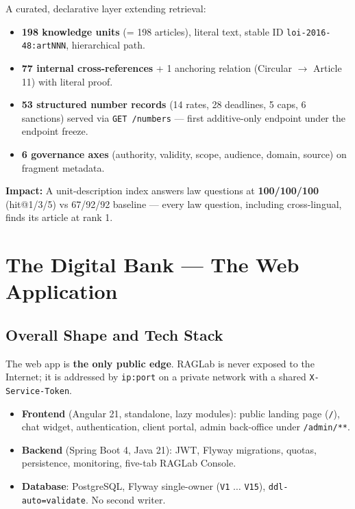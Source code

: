 \documentclass[a4paper,12pt]{report}
\begin{document}
A curated, declarative layer extending retrieval:

\begin{itemize}[leftmargin=1.2cm, itemsep=2pt]
\item \textbf{198 knowledge units} (= 198 articles), literal text, stable ID \texttt{loi-2016-48:artNNN}, hierarchical path.
\item \textbf{77 internal cross-references} + 1 anchoring relation (Circular $\rightarrow$ Article 11) with literal proof.
\item \textbf{53 structured number records} (14 rates, 28 deadlines, 5 caps, 6 sanctions) served via \texttt{GET /numbers} --- first additive-only endpoint under the endpoint freeze.
\item \textbf{6 governance axes} (authority, validity, scope, audience, domain, source) on fragment metadata.
\end{itemize}

\begin{tcolorbox}[colback=softGray, colframe=chapterBlue!25, boxrule=0.5pt, arc=3pt]
\small \textbf{Impact:} A unit-description index answers law questions at \textbf{100/100/100} (hit@1/3/5) vs 67/92/92 baseline --- every law question, including cross-lingual, finds its article at rank 1.
\end{tcolorbox}

\chapter{The Digital Bank --- The Web Application}

\section{Overall Shape and Tech Stack}

The web app is \textbf{the only public edge}. RAGLab is never exposed to the Internet; it is addressed by \texttt{ip:port} on a private network with a shared \texttt{X-Service-Token}.

\begin{itemize}[leftmargin=1.2cm, itemsep=2pt]
\item \textbf{Frontend} (Angular 21, standalone, lazy modules): public landing page (\texttt{/}), chat widget, authentication, client portal, admin back-office under \texttt{/admin/**}.
\item \textbf{Backend} (Spring Boot 4, Java 21): JWT, Flyway migrations, quotas, persistence, monitoring, five-tab RAGLab Console.
\item \textbf{Database}: PostgreSQL, Flyway single-owner (\texttt{V1} $\ldots$ \texttt{V15}), \texttt{ddl-auto=validate}. No second writer.
\end{itemize}
\end{document}
